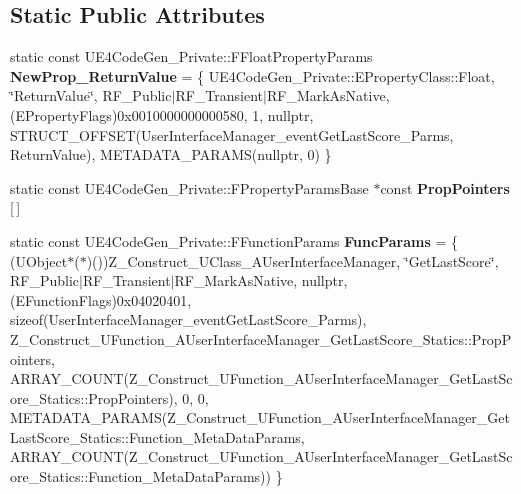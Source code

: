 \subsection*{Static Public Attributes}
\begin{DoxyCompactItemize}
\item 
\mbox{\label{struct_z___construct___u_function___a_user_interface_manager___get_last_score___statics_a0bf385cd3c8c8e782cc2072ca2646b3f}} 
static const U\+E4\+Code\+Gen\+\_\+\+Private\+::\+F\+Float\+Property\+Params {\bfseries New\+Prop\+\_\+\+Return\+Value} = \{ U\+E4\+Code\+Gen\+\_\+\+Private\+::\+E\+Property\+Class\+::\+Float, \char`\"{}Return\+Value\char`\"{}, R\+F\+\_\+\+Public$\vert$R\+F\+\_\+\+Transient$\vert$R\+F\+\_\+\+Mark\+As\+Native, (E\+Property\+Flags)0x0010000000000580, 1, nullptr, S\+T\+R\+U\+C\+T\+\_\+\+O\+F\+F\+S\+E\+T(\+User\+Interface\+Manager\+\_\+event\+Get\+Last\+Score\+\_\+\+Parms, Return\+Value), M\+E\+T\+A\+D\+A\+T\+A\+\_\+\+P\+A\+R\+A\+M\+S(nullptr, 0) \}
\item 
static const U\+E4\+Code\+Gen\+\_\+\+Private\+::\+F\+Property\+Params\+Base $\ast$const {\bfseries Prop\+Pointers} \mbox{[}$\,$\mbox{]}
\item 
\mbox{\label{struct_z___construct___u_function___a_user_interface_manager___get_last_score___statics_a8aa03cf38f69666e933030cee2ad9c5c}} 
static const U\+E4\+Code\+Gen\+\_\+\+Private\+::\+F\+Function\+Params {\bfseries Func\+Params} = \{ (U\+Object$\ast$($\ast$)())Z\+\_\+\+Construct\+\_\+\+U\+Class\+\_\+\+A\+User\+Interface\+Manager, \char`\"{}Get\+Last\+Score\char`\"{}, R\+F\+\_\+\+Public$\vert$R\+F\+\_\+\+Transient$\vert$R\+F\+\_\+\+Mark\+As\+Native, nullptr, (E\+Function\+Flags)0x04020401, sizeof(\+User\+Interface\+Manager\+\_\+event\+Get\+Last\+Score\+\_\+\+Parms), Z\+\_\+\+Construct\+\_\+\+U\+Function\+\_\+\+A\+User\+Interface\+Manager\+\_\+\+Get\+Last\+Score\+\_\+\+Statics\+::\+Prop\+Pointers, A\+R\+R\+A\+Y\+\_\+\+C\+O\+U\+N\+T(\+Z\+\_\+\+Construct\+\_\+\+U\+Function\+\_\+\+A\+User\+Interface\+Manager\+\_\+\+Get\+Last\+Score\+\_\+\+Statics\+::\+Prop\+Pointers), 0, 0, M\+E\+T\+A\+D\+A\+T\+A\+\_\+\+P\+A\+R\+A\+M\+S(\+Z\+\_\+\+Construct\+\_\+\+U\+Function\+\_\+\+A\+User\+Interface\+Manager\+\_\+\+Get\+Last\+Score\+\_\+\+Statics\+::\+Function\+\_\+\+Meta\+Data\+Params, A\+R\+R\+A\+Y\+\_\+\+C\+O\+U\+N\+T(\+Z\+\_\+\+Construct\+\_\+\+U\+Function\+\_\+\+A\+User\+Interface\+Manager\+\_\+\+Get\+Last\+Score\+\_\+\+Statics\+::\+Function\+\_\+\+Meta\+Data\+Params)) \}
\end{DoxyCompactItemize}


